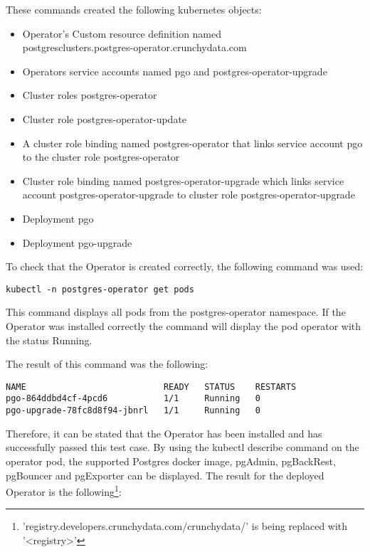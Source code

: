 These commands created the following kubernetes objects:
\begin{itemize}
  \item Operator's Custom resource definition named \\postgresclusters.postgres-operator.crunchydata.com
  \item Operators service accounts named pgo and postgres-operator-upgrade
  \item Cluster roles postgres-operator
  \item Cluster role postgres-operator-update
  \item A cluster role binding named postgres-operator that links service account pgo to the cluster role postgres-operator
  \item Cluster role binding named postgres-operator-upgrade which links service account postgres-operator-upgrade to cluster role postgres-operator-upgrade
  \item Deployment pgo
  \item Deployment pgo-upgrade
\end{itemize}


To check that the Operator is created correctly, the following command was used:
\begin{verbatim}
kubectl -n postgres-operator get pods
\end{verbatim}

This command displays all pods from the postgres-operator namespace. If the Operator was installed correctly the command will display the pod operator with the status Running.

The result of this command was the following:
\begin{verbatim}
NAME                           READY   STATUS    RESTARTS
pgo-864ddbd4cf-4pcd6           1/1     Running   0
pgo-upgrade-78fc8d8f94-jbnrl   1/1     Running   0 
\end{verbatim}

Therefore, it can be stated that the Operator has been installed and has successfully passed this test case.
\label{chap:pgoclusterinstall}
By using the kubectl describe command on the operator pod, the supported Postgres docker image, pgAdmin, pgBackRest, pgBouncer and pgExporter can be displayed. The result for the deployed Operator is the following\footnote{'registry.developers.crunchydata.com/crunchydata/' is being replaced with '<registry>'}:

